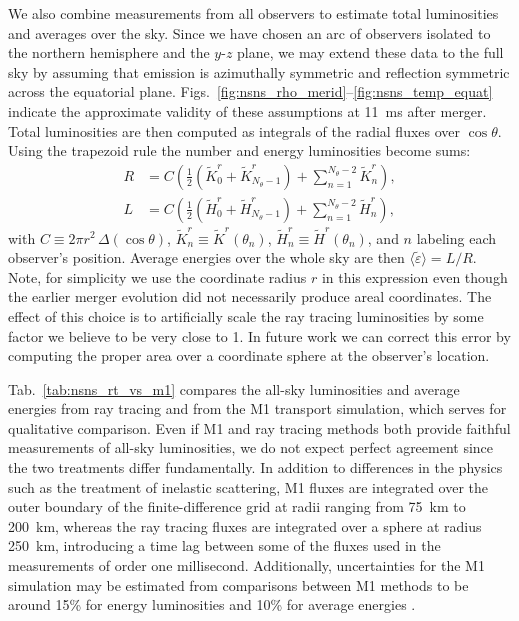 \documentclass[aps,floatfix,prd,superscriptaddress,twocolumn]{revtex4-1}
\begin{document}
We also combine measurements from all observers to estimate
total luminosities and averages over the sky.
Since we have chosen an arc of observers isolated to the northern hemisphere and
the $y$-$z$ plane, we may extend these data to the full sky by assuming that
emission is azimuthally symmetric and reflection symmetric across the
equatorial plane. Figs.~\ref{fig:nsns_rho_merid}--\ref{fig:nsns_temp_equat}
indicate the approximate validity of these assumptions at 11~ms after merger.
Total luminosities are then computed as integrals of the radial fluxes
over $\cos\theta$.
Using the trapezoid rule the number and energy luminosities become sums:
\begin{align}
  \label{eqn:luminosity_R}
  R &= C
  \left(\frac{1}{2}(\tilde{K}^r_0+\tilde{K}^r_{N_\theta-1})
  +\sum\limits_{n=1}^{N_\theta-2}\tilde{K}^r_n\right),\\
  \label{eqn:luminosity_L}
  L &= C
  \left(\frac{1}{2}(\tilde{H}^r_0+\tilde{H}^r_{N_\theta-1})
  +\sum\limits_{n=1}^{N_\theta-2}\tilde{H}^r_n\right),
\end{align}
with $C \equiv 2\pi r^2\, \Delta(\cos \theta)$,
$\tilde{K}^r_n \equiv \tilde{K}^r(\theta_n)$,
$\tilde{H}^r_n \equiv \tilde{H}^r(\theta_n)$,
and $n$ labeling each observer's position.
Average energies over the whole sky are then
$\langle\tilde{\varepsilon}\rangle=L/R$.
Note, for simplicity we use the coordinate radius $r$ in this expression even
though the earlier merger evolution did not necessarily produce
areal coordinates. The effect of this choice is to artificially scale the
ray tracing luminosities by some factor we believe to be very close to 1.
In future work we can correct this error by computing the proper area over
a coordinate sphere at the observer's location.

Tab.~\ref{tab:nsns_rt_vs_m1} compares the all-sky
luminosities and average energies from ray tracing and from
the M1 transport simulation,
which serves for qualitative comparison.
Even if M1 and ray tracing methods both provide faithful measurements
of all-sky luminosities, we do not expect perfect agreement since the two
treatments differ fundamentally. In addition to differences in the physics
such as the treatment of inelastic scattering,
M1 fluxes are integrated over the outer boundary of the finite-difference grid
at radii ranging from 75~km to 200~km,
whereas the ray tracing fluxes are integrated over a sphere at radius 250~km,
introducing a time lag between some of the fluxes used in the measurements
of order one millisecond.
Additionally, uncertainties for the M1 simulation may be estimated from
comparisons between M1 methods to be around
15\% for energy luminosities and
10\% for average energies \cite[Sec.~A.6]{fouc2016-m1_evolve_n}.
\end{document}
